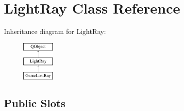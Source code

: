 \hypertarget{class_light_ray}{}\section{Light\+Ray Class Reference}
\label{class_light_ray}
Inheritance diagram for Light\+Ray\+:\begin{figure}[H]
\begin{center}
\leavevmode
\includegraphics[height=2.000000cm]{class_light_ray}
\end{center}
\end{figure}
\subsection*{Public Slots}
